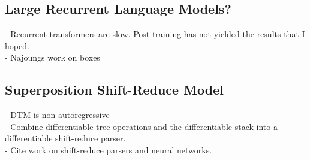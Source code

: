\subsection{Large Recurrent Language Models?}
- Recurrent transformers are slow. Post-training has not yielded the results that I hoped.\\
- Najoungs work on boxes

\subsection{Superposition Shift-Reduce Model}
- DTM is non-autoregressive\\
- Combine differentiable tree operations and the differentiable stack into a differentiable shift-reduce parser.\\
- Cite work on shift-reduce parsers and neural networks.